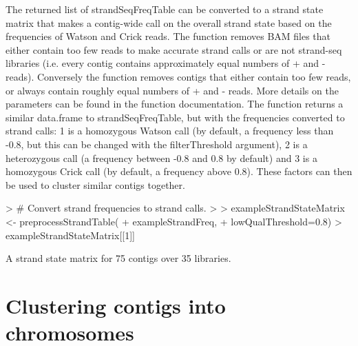 \documentclass{article}
\begin{document}
The returned list of strandSeqFreqTable can be converted to a strand state matrix that makes a contig-wide call on the overall strand state based on the frequencies of Watson and Crick reads. The function removes BAM files that either contain too few reads to make accurate strand calls or are not strand-seq libraries (i.e. every contig contains approximately equal numbers of + and - reads). Conversely the function removes contigs that either contain too few reads, or always contain roughly equal numbers of + and - reads.  More details on the parameters can be found in the function documentation.  The function returns a similar data.frame to strandSeqFreqTable, but with the frequencies converted to strand calls: 1 is a homozygous Watson call (by default, a frequency less than -0.8, but this can be changed with the filterThreshold argument), 2 is a heterozygous call (a frequency between -0.8 and 0.8 by default) and 3 is a homozygous Crick call (by default, a frequency above 0.8).  These factors can then be used to cluster similar contigs together.\\


\begin{Schunk}
\begin{Sinput}
> # Convert strand frequencies to strand calls.
> 
> exampleStrandStateMatrix <- preprocessStrandTable(
+ exampleStrandFreq, 
+ lowQualThreshold=0.8)
> exampleStrandStateMatrix[[1]]
\end{Sinput}
\begin{Soutput}
A strand state matrix for  75  contigs over  35  libraries.
\end{Soutput}
\end{Schunk}

\section{Clustering contigs into chromosomes}
\end{document}
